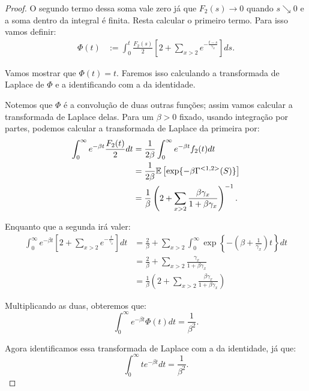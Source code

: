 \begin{proof}
  O segundo termo dessa soma vale zero já que $F_2(s) \to 0$ quando $s
  \searrow 0$ e a soma dentro da integral é finita. Resta calcular o
  primeiro termo. Para isso vamos definir:
  \begin{align*}
    \Phi(t) &:= \int_0^t \frac{F_2(s)}{2} \left[
      2 + \sum_{x > 2} e^{-\frac{t-s}{\gamma_x}}
    \right] ds.
  \end{align*}

  Vamos mostrar que $\Phi(t) = t$. Faremos isso calculando a
  transformada de Laplace de $\Phi$ e a identificando com a da
  identidade.

  Notemos que $\Phi$ é a convolução de duas outras funções; assim
  vamos calcular a transformada de Laplace delas. Para um $\beta > 0$
  fixado, usando integração por partes, podemos calcular a
  transformada de Laplace da primeira por:
  \begin{align*}
    \int_0^{\infty} e^{-\beta t} \frac{F_2(t)}{2} dt 
    &= \frac{1}{2 \beta} \int_0^\infty e^{-\beta t}  f_2(t) dt\\
    &= \frac{1}{2 \beta}
    {\mathbb{E}} \left[ \exp \{-\beta \Gamma^{<1,2>} (S)\}  \right]\\
    &= \frac{1}{\beta}
    \left( 2 + \sum_{x > 2}
      \frac{\beta\gamma_x}{1 + \beta \gamma_x}  \right)^{-1}.
  \end{align*}

  Enquanto que a segunda irá valer:
  \begin{align*}
    \int_0^{\infty} e^{-\beta t} \left[
      2 + \sum_{x > 2} e^{-\frac{t}{\gamma_x}}
    \right]  dt 
    &= \frac{2}{\beta} + \sum_{x > 2} \int_0^\infty \exp \left\{
      - \left(\beta + \frac{1}{\gamma_x} \right) t \right\} dt\\
    &= \frac{2}{\beta} + \sum_{x > 2} \frac{\gamma_x}{1 +
      \beta\gamma_x}\\
    &= \frac{1}{\beta} \left(
      2 + \sum_{x > 2} \frac{\beta\gamma_x}{1 +
      \beta\gamma_x}
    \right)
  \end{align*}

  Multiplicando as duas, obteremos que:
  \begin{displaymath}
    \int_0^\infty e^{- \beta t} \Phi(t) dt = \frac{1}{\beta^2}.
  \end{displaymath}

  Agora identificamos essa transformada de Laplace com a da
  identidade, já que:
  \begin{displaymath}
    \int_0^\infty t e^{- \beta t}  d t = \frac{1}{\beta^2}.
  \end{displaymath}



\end{proof}
